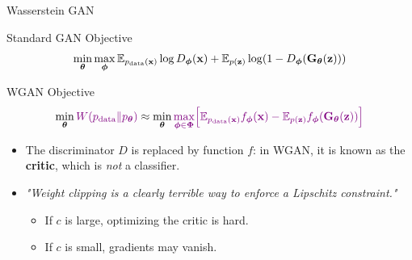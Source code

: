 \documentclass{beamer}
\begin{document}
\begin{frame}{Wasserstein GAN}
	\begin{block}{Standard GAN Objective}
		\vspace{-0.2cm}
		\[
			\min_{\boldsymbol{\theta}} \max_{\boldsymbol{\phi}} \mathbb{E}_{p_{\text{data}}(\mathbf{x})} \log D_{\boldsymbol{\phi}}(\mathbf{x}) + \mathbb{E}_{p(\mathbf{z})} \log (1 - D_{\boldsymbol{\phi}}(\mathbf{G}_{\boldsymbol{\theta}}(\mathbf{z})))
		\]
		\vspace{-0.3cm}
	\end{block}
	\begin{block}{WGAN Objective}
		\vspace{-0.3cm}
		\[
			\min_{\boldsymbol{\theta}} {\color{violet}W(p_{\text{data}} \| p_{\boldsymbol{\theta}})} \approx \min_{\boldsymbol{\theta}} {\color{violet}\max_{\boldsymbol{\phi} \in \boldsymbol{\Phi}} \Bigl[ \mathbb{E}_{p_{\text{data}}(\mathbf{x})} f_{\boldsymbol{\phi}}(\mathbf{x})  - \mathbb{E}_{p(\mathbf{z})} f_{\boldsymbol{\phi}}(\mathbf{G}_{\boldsymbol{\theta}}(\mathbf{z}))\Bigr]}
		\]
		\vspace{-0.3cm}
	\end{block}
	\eqpause
	\begin{itemize}
		\item The discriminator $D$ is replaced by function $f$: in WGAN, it is known as the \textbf{critic}, which is \emph{not} a classifier.
		\item \textit{"Weight clipping is a clearly terrible way to enforce a Lipschitz constraint."}
		\begin{itemize}
			\item If $c$ is large, optimizing the critic is hard.
			\item If $c$ is small, gradients may vanish.
		\end{itemize}
	\end{itemize}	
\end{frame}
\end{document}

